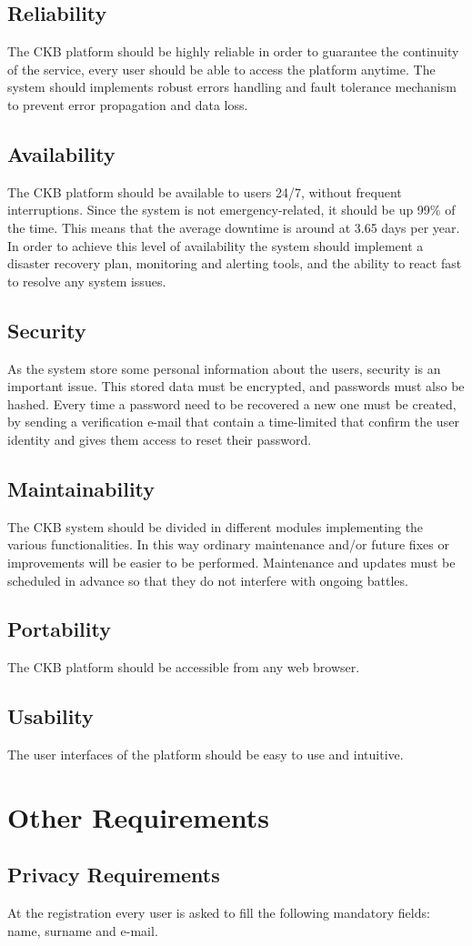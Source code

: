 \subsection{Reliability}
The CKB platform should be highly reliable in order to guarantee the continuity of the service, every user should be able to access the platform anytime. The system should implements robust errors handling and fault tolerance mechanism to prevent error propagation and data loss. \subsection{Availability}
The CKB platform should be available to users 24/7, without frequent interruptions. 
Since the system is not emergency-related, it should be up 99\% of the time.
This means that the average downtime is around at 3.65 days per year. \newline
In order to achieve this level of availability the system should implement a disaster recovery plan, monitoring and alerting tools, and the ability to react fast to resolve any system issues.
\subsection{Security}
As the system store some personal information about the users, security is an important issue. This stored data must be encrypted, and passwords must also be hashed. \newline
Every time a password need to be recovered a new one must be created, by sending a verification e-mail that contain a time-limited that confirm the user identity and gives them access to reset their password.
\subsection{Maintainability}
The CKB system should be divided in different modules implementing the various functionalities. In this way ordinary maintenance and/or future fixes or improvements will be easier to be performed. \newline
Maintenance and updates must be scheduled in advance so that they do not interfere with ongoing battles. 
\subsection{Portability}
The CKB platform should be accessible from any web browser.
\subsection{Usability}
The user interfaces of the platform should be easy to use and intuitive.

\section{Other Requirements}
\subsection{Privacy Requirements}
At the registration every user is asked to fill the following mandatory fields:
name, surname and e-mail. 
